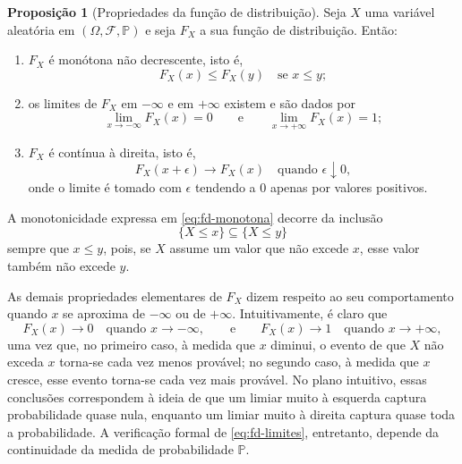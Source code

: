 \documentclass[12pt,portuguese]{article}
\theoremstyle{definition}
\newtheorem{proposition}[proposition]{Proposição}
\theoremstyle{plainexercise}
\theoremstyle{starredexercise}
\theoremstyle{definition}
\begin{document}
\begin{proposition}[Propriedades da função de distribuição]
\label{prop:propriedades-funcao-distribuicao}
Seja $X$ uma variável aleatória em $(\Omega,\mathcal{F},\mathbb{P})$ e seja
$F_X$ a sua função de distribuição. Então:

\begin{enumerate}[label=\textup{(\roman*)}]
  \item $F_X$ é monótona não decrescente, isto é,
    \begin{equation}
    \label{eq:fd-monotona}
      F_X(x)\leqslant F_X(y)\quad\text{se } x\leqslant y;
    \end{equation}
  \item os limites de $F_X$ em $-\infty$ e em $+\infty$ existem e são dados por
    \begin{equation}
    \label{eq:fd-limites}
      \lim_{x\to-\infty}F_X(x)=0
      \qquad\text{e}\qquad
      \lim_{x\to+\infty}F_X(x)=1;
    \end{equation}
  \item $F_X$ é contínua à direita, isto é,
    \begin{equation}
    \label{eq:fd-continua-direita}
      F_X(x+\epsilon)\to F_X(x)\quad\text{quando } \epsilon\downarrow 0,
    \end{equation}
    onde o limite é tomado com $\epsilon$ tendendo a $0$ apenas por valores
    positivos.
\end{enumerate}
\end{proposition}

A monotonicidade expressa em \eqref{eq:fd-monotona} decorre da inclusão
\[
  \{X\leqslant x\}\subseteq\{X\leqslant y\}
\]
sempre que $x\leqslant y$, pois, se $X$ assume um valor que não excede $x$,
esse valor também não excede $y$.

As demais propriedades elementares de $F_X$ dizem respeito ao seu
comportamento quando $x$ se aproxima de $-\infty$ ou de $+\infty$.
Intuitivamente, é claro que
\[
  F_X(x)\to 0 \quad\text{quando } x\to-\infty,
  \qquad\text{e}\qquad
  F_X(x)\to 1 \quad\text{quando } x\to+\infty,
\]
uma vez que, no primeiro caso, à medida que $x$ diminui, o evento de que $X$
não exceda $x$ torna-se cada vez menos provável; no segundo caso, à
medida que $x$ cresce, esse evento torna-se cada vez mais provável. No plano
intuitivo, essas conclusões correspondem à ideia de que um limiar muito à
esquerda captura probabilidade quase nula, enquanto um limiar muito à direita
captura quase toda a probabilidade. A verificação formal de
\eqref{eq:fd-limites}, entretanto, depende da continuidade da medida de
probabilidade $\mathbb{P}$.
\end{document}
